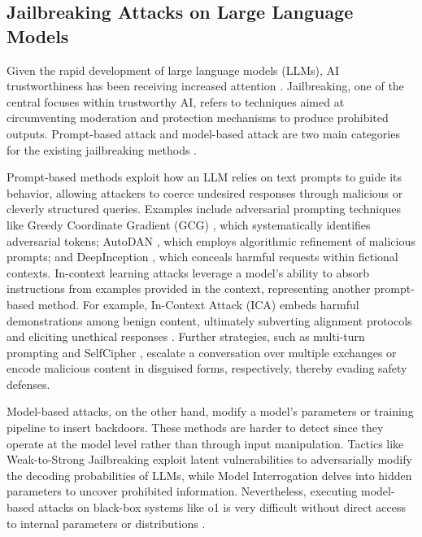 \subsection{Jailbreaking Attacks on Large Language Models}
Given the rapid development of large language models (LLMs), AI trustworthiness has been receiving increased attention \cite{zou2023universaltransferableadversarialattacks,peng2024jailbreakingmitigationvulnerabilitieslarge,zhao2024weaktostrongjailbreakinglargelanguage,guan2024deliberative,openai2024openaio1card,yao2024federated,zhang2024min,federatedgpt,kuo2025proactive}. Jailbreaking, one of the central focuses within trustworthy AI, refers to techniques aimed at circumventing moderation and protection mechanisms to produce prohibited outputs. Prompt-based attack and model-based attack are two main categories for the existing jailbreaking methods \citep{peng2024jailbreakingmitigationvulnerabilitieslarge,yi2024jailbreakattacksdefenseslarge}. 


Prompt-based methods exploit how an LLM relies on text prompts to guide its behavior, allowing attackers to coerce undesired responses through malicious or cleverly structured queries. Examples include adversarial prompting techniques like Greedy Coordinate Gradient (GCG) \citep{zou2023universaltransferableadversarialattacks}, which systematically identifies adversarial tokens; AutoDAN \citep{liu2024autodangeneratingstealthyjailbreak}, which employs algorithmic refinement of malicious prompts; and DeepInception \citep{li2024deepinceptionhypnotizelargelanguage}, which conceals harmful requests within fictional contexts. In-context learning attacks leverage a model’s ability to absorb instructions from examples provided in the context, representing another prompt-based method. For example, In-Context Attack (ICA) \citep{Wei2023JailbreakAG} embeds harmful demonstrations among benign content, ultimately subverting alignment protocols and eliciting unethical responses \citep{Wei2023JailbreakAG}. Further strategies, such as multi-turn prompting \citep{ren2024derail} and SelfCipher \citep{yuan2024gpt4smartsafestealthy}, escalate a conversation over multiple exchanges or encode malicious content in disguised forms, respectively, thereby evading safety defenses.


Model-based attacks, on the other hand, modify a model’s parameters or training pipeline to insert backdoors. These methods are harder to detect since they operate at the model level rather than through input manipulation. Tactics like Weak-to-Strong Jailbreaking \citep{zhao2024weaktostrongjailbreakinglargelanguage} exploit latent vulnerabilities to adversarially modify
the decoding probabilities of LLMs, while Model Interrogation \citep{liu2024makingaskanswerjailbreaking} delves into hidden parameters to uncover prohibited information. Nevertheless, executing model-based attacks on black-box systems like o1 is very difficult without direct access to internal parameters or distributions \cite{zhao2024weaktostrongjailbreakinglargelanguage,liu2024makingaskanswerjailbreaking}. 




